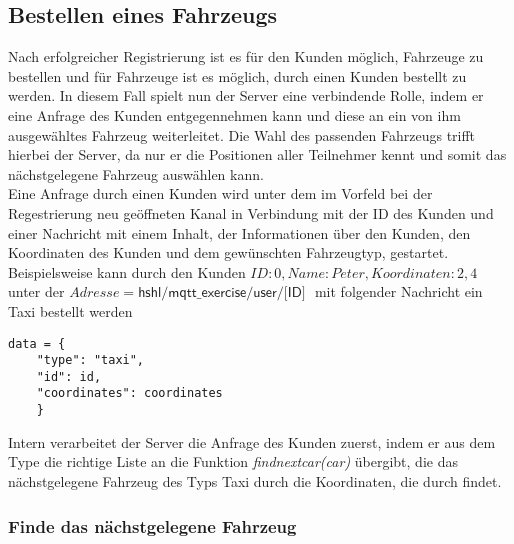 \documentclass[conference]{IEEEtran}
\begin{document}
\subsection{Bestellen eines Fahrzeugs}
Nach erfolgreicher Registrierung ist es für den Kunden möglich, Fahrzeuge zu bestellen und für Fahrzeuge ist es möglich, durch einen Kunden bestellt zu werden. In diesem Fall spielt nun der Server eine verbindende Rolle, indem er eine Anfrage des Kunden entgegennehmen kann und diese an ein von ihm ausgewähltes Fahrzeug weiterleitet. Die Wahl des passenden Fahrzeugs trifft hierbei der Server, da nur er die Positionen aller Teilnehmer kennt und somit das nächstgelegene Fahrzeug auswählen kann.\\ 
Eine Anfrage durch einen Kunden wird unter dem im Vorfeld bei der Regestrierung neu geöffneten Kanal in Verbindung mit der ID des Kunden und einer Nachricht mit einem Inhalt, der Informationen über den Kunden, den Koordinaten des Kunden und dem gewünschten Fahrzeugtyp, gestartet. Beispielsweise kann durch den Kunden $ID: 0, Name: Peter, Koordinaten: 2,4$ unter der $Adresse=\textsf{hshl/mqtt\_exercise/user/[ID] }$ mit folgender Nachricht ein Taxi bestellt werden \begin{lstlisting}
data = {
	"type": "taxi",
    "id": id,
    "coordinates": coordinates
    }
\end{lstlisting}
Intern verarbeitet der Server die Anfrage des Kunden zuerst, indem er aus dem Type die richtige Liste an die Funktion \textit{findnextcar(car)} übergibt, die das nächstgelegene Fahrzeug des Typs Taxi durch die Koordinaten, die durch findet.
\subsubsection{Finde das nächstgelegene Fahrzeug}

\begin{thebibliography}{00}
\end{thebibliography}
\vspace{12pt}
\end{document}
